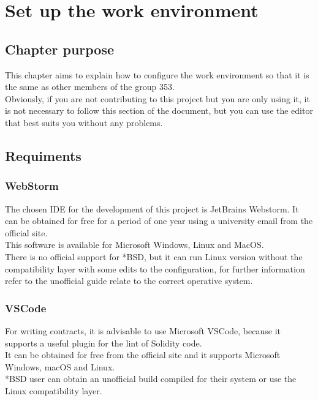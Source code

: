 \documentclass[ManualeSviluppatore.tex]{subfiles}
\begin{document}
\chapter{Set up the work environment}
\section{Chapter purpose}
This chapter aims to explain how to configure the work environment so that it is the same as other members of the group 353. \\
Obviously, if you are not contributing to this project but you are only using it, it is not necessary to follow this section of the document, but you can use the editor that best suits you without any problems.

\section{Requiments}
\subsection{WebStorm}
The chosen IDE for the development of this project is JetBrains Webstorm. It can be obtained for free for a period of one year using a university email from the official site. \\
This software is available for Microsoft Windows, Linux and MacOS. \\
There is no official support for *BSD, but it can run Linux version without the compatibility layer with some edits to the configuration, for further information refer to the unofficial guide relate to the correct operative system.

\subsection{VSCode}
For writing contracts, it is advisable to use Microsoft VSCode, because it supports a useful plugin for the lint of Solidity code. \\
It can be obtained for free from the official site and it supports Microsoft Windows, macOS and Linux. \\
*BSD user can obtain an unofficial build compiled for their system or use the Linux compatibility layer. \\
\end{document}
